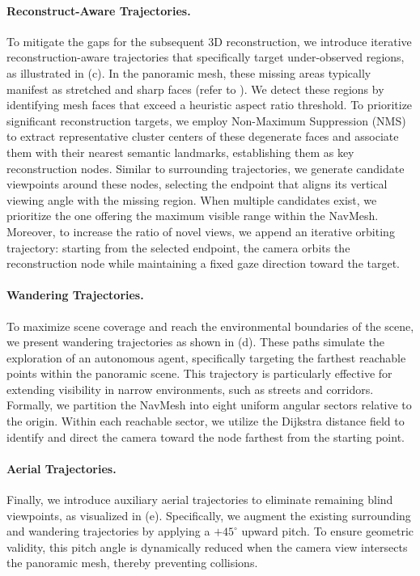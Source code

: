 \documentclass{article} %
\begin{document}
\paragraph{Reconstruct-Aware Trajectories.} 
To mitigate the gaps for the subsequent 3D reconstruction, we introduce iterative reconstruction-aware trajectories that specifically target under-observed regions, as illustrated in (c).
In the panoramic mesh, these missing areas typically manifest as stretched and sharp faces (refer to ). 
We detect these regions by identifying mesh faces that exceed a heuristic aspect ratio threshold. To prioritize significant reconstruction targets, we employ Non-Maximum Suppression (NMS) to extract representative cluster centers of these degenerate faces and associate them with their nearest semantic landmarks, establishing them as key reconstruction nodes.
Similar to surrounding trajectories, we generate candidate viewpoints around these nodes, selecting the endpoint that aligns its vertical viewing angle with the missing region. When multiple candidates exist, we prioritize the one offering the maximum visible range within the NavMesh.
Moreover, to increase the ratio of novel views, we append an iterative orbiting trajectory: starting from the selected endpoint, the camera orbits the reconstruction node while maintaining a fixed gaze direction toward the target.

\paragraph{Wandering Trajectories.}
To maximize scene coverage and reach the environmental boundaries of the scene, we present wandering trajectories as shown in (d).
These paths simulate the exploration of an autonomous agent, specifically targeting the farthest reachable points within the panoramic scene.
This trajectory is particularly effective for extending visibility in narrow environments, such as streets and corridors.
Formally, we partition the NavMesh into eight uniform angular sectors relative to the origin. Within each reachable sector, we utilize the Dijkstra distance field to identify and direct the camera toward the node farthest from the starting point. 


\paragraph{Aerial Trajectories.}
Finally, we introduce auxiliary aerial trajectories to eliminate remaining blind viewpoints, as visualized in (e). Specifically, we augment the existing surrounding and wandering trajectories by applying a $+45^\circ$ upward pitch. To ensure geometric validity, this pitch angle is dynamically reduced when the camera view intersects the panoramic mesh, thereby preventing collisions.
\end{document}
